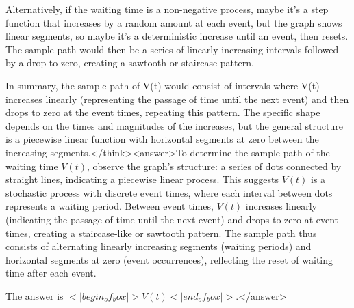 Alternatively, if the waiting time is a non-negative process, maybe it's a step function that increases by a random amount at each event, but the graph shows linear segments, so maybe it's a deterministic increase until an event, then resets. The sample path would then be a series of linearly increasing intervals followed by a drop to zero, creating a sawtooth or staircase pattern.

In summary, the sample path of V(t) would consist of intervals where V(t) increases linearly (representing the passage of time until the next event) and then drops to zero at the event times, repeating this pattern. The specific shape depends on the times and magnitudes of the increases, but the general structure is a piecewise linear function with horizontal segments at zero between the increasing segments.</think><answer>To determine the sample path of the waiting time \( V(t) \), observe the graph's structure: a series of dots connected by straight lines, indicating a piecewise linear process. This suggests \( V(t) \) is a stochastic process with discrete event times, where each interval between dots represents a waiting period. Between event times, \( V(t) \) increases linearly (indicating the passage of time until the next event) and drops to zero at event times, creating a staircase-like or sawtooth pattern. The sample path thus consists of alternating linearly increasing segments (waiting periods) and horizontal segments at zero (event occurrences), reflecting the reset of waiting time after each event.  

The answer is \(<|begin_of_box|>V(t)<|end_of_box|>\).</answer>